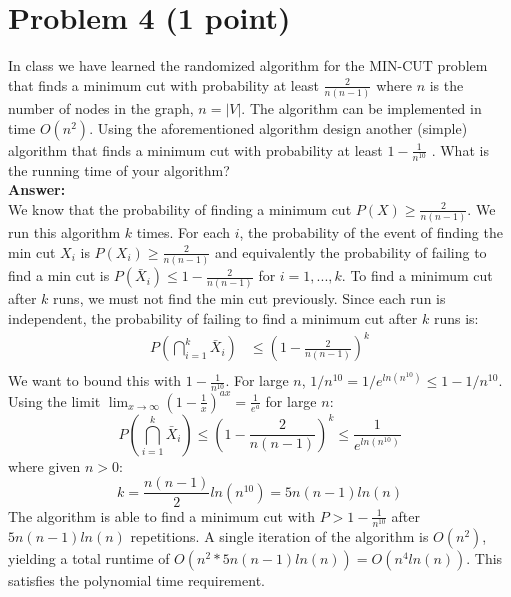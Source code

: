 \documentclass[letterpaper, 11pt]{article}
\begin{document}
\section*{Problem 4 (1 point)}
In class we have learned the randomized algorithm for the MIN-CUT problem that finds a minimum cut with probability at least $\frac{2}{n(n-1)}$ where $n$ is the number of nodes in the graph, $n = |V|$. The algorithm can be implemented in time $O(n^2)$. Using the aforementioned algorithm design another (simple) algorithm that finds a minimum cut with probability at least $1 - \frac{1}{n^{10}}$ . What is the running time of your algorithm? \\
\textbf{Answer:} \\
We know that the probability of finding a minimum cut $P(X) \geq \frac{2}{n(n-1)}$. We run this algorithm $k$ times. For each $i$, the probability of the event of finding the min cut $X_i$ is $P(X_i) \geq \frac{2}{n(n-1)}$ and equivalently the probability of failing to find a min cut is $P(\bar X_i) \leq 1- \frac{2}{n(n-1)}$ for $i = 1,...,k$. To find a minimum cut after $k$ runs, we must not find the min cut previously. Since each run is independent, the probability of failing to find a minimum cut after $k$ runs is:
\begin{align*}
P\left(\bigcap_{i=1}^k \bar X_i \right) &\leq \left(1-\frac{2}{n(n-1)} \right)^k \\
\end{align*}
We want to bound this with $1-\frac{1}{n^{10}}$. For large $n$, $1/n^{10} = 1/e^{ln(n^{10})} \leq 1- 1/n^{10}$. Using the limit $\lim_{x \to \infty} \left(1-\frac{1}{x}\right)^{ax}=\frac{1}{e^a}$ for large $n$:
$$P\left(\bigcap_{i=1}^k \bar X_i \right) \leq  \left(1-\frac{2}{n(n-1)} \right)^k \leq \frac{1}{e^{ln(n^{10})}}$$
where given $n>0$:
$$k=\frac{n(n-1)}{2}ln\left(n^{10}\right)=5n(n-1)ln(n)$$
The algorithm is able to find a minimum cut with $P>1-\frac{1}{n^{10}}$ after $5n(n-1)ln(n)$ repetitions. A single iteration of the algorithm is $O(n^2)$, yielding a total runtime of $O(n^2*5n(n-1)ln(n)) = O(n^4ln(n))$. This satisfies the polynomial time requirement.
\pagebreak
\end{document}
